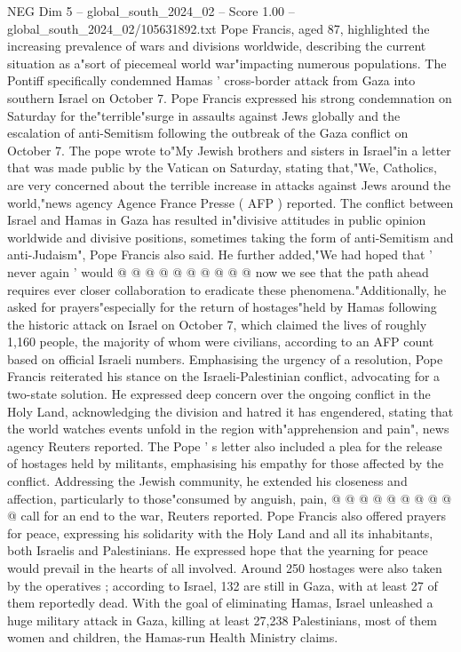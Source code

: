 \begin{textsample}{NEG Dim 5 – global\_south\_2024\_02 – Score 1.00 – global\_south\_2024\_02/105631892.txt}  \label{ex:f5_neg_260}
Pope Francis, aged 87, highlighted the increasing prevalence of wars and divisions worldwide, describing the current situation as a"sort of piecemeal world war"impacting numerous populations.
The Pontiff specifically condemned Hamas ' cross-border attack from Gaza into southern Israel on October 7.
Pope Francis expressed his strong condemnation on Saturday for the"terrible"surge in assaults against Jews globally and the escalation of anti-Semitism following the outbreak of the Gaza conflict on October 7.
The pope wrote to"My Jewish brothers and sisters in Israel"in a letter that was made public by the Vatican on Saturday, stating that,"We, Catholics, are very concerned about the terrible increase in attacks against Jews around the world,"news agency Agence France Presse ( AFP ) reported.
The conflict between Israel and Hamas in Gaza has resulted in"divisive attitudes in public opinion worldwide and divisive positions, sometimes taking the form of anti-Semitism and anti-Judaism", Pope Francis also said.
He further added,"We had hoped that ' never again ' would @ @ @ @ @ @ @ @ @ @ now we see that the path ahead requires ever closer collaboration to eradicate these phenomena."Additionally, he asked for prayers"especially for the return of hostages"held by Hamas following the historic attack on Israel on October 7, which claimed the lives of roughly 1,160 people, the majority of whom were civilians, according to an AFP count based on official Israeli numbers.
Emphasising the urgency of a resolution, Pope Francis reiterated his stance on the Israeli-Palestinian conflict, advocating for a two-state solution.
He expressed deep concern over the ongoing conflict in the Holy Land, acknowledging the division and hatred it has engendered, stating that the world watches events unfold in the region with"apprehension and pain", news agency Reuters reported.
The Pope ' s letter also included a plea for the release of hostages held by militants, emphasising his empathy for those affected by the conflict.
Addressing the Jewish community, he extended his closeness and affection, particularly to those"consumed by anguish, pain, @ @ @ @ @ @ @ @ @ @ call for an end to the war, Reuters reported.
Pope Francis also offered prayers for peace, expressing his solidarity with the Holy Land and all its inhabitants, both Israelis and Palestinians.
He expressed hope that the yearning for peace would prevail in the hearts of all involved.
Around 250 hostages were also taken by the operatives ; according to Israel, 132 are still in Gaza, with at least 27 of them reportedly dead.
With the goal of eliminating Hamas, Israel unleashed a huge military attack in Gaza, killing at least 27,238 Palestinians, most of them women and children, the Hamas-run Health Ministry claims.

\end{textsample}
